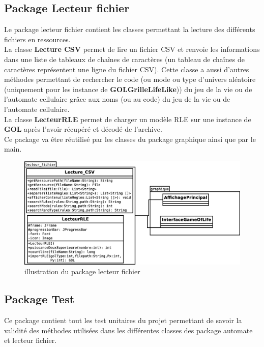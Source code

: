 \subsection{Package Lecteur fichier}
\par Le package lecteur fichier contient les classes permettant la lecture des différents fichiers en ressources.\\
La classe \textbf{Lecture CSV} permet de lire un fichier CSV et renvoie les informations dans une liste de tableaux de chaînes de caractères (un tableau de chaînes de caractères représentent une ligne du fichier CSV). Cette classe a aussi d'autres méthodes permettant de rechercher le code (ou mode ou type d'univers aléatoire (uniquement pour les instance de \textbf{GOLGrilleLifeLike}))  du jeu de la vie ou de l'automate cellulaire grâce aux noms (ou au code) du jeu de la vie ou de l'automate cellulaire.\\
La classe \textbf{LecteurRLE} permet de charger un modèle RLE sur une instance de \textbf{GOL} après l'avoir récupéré et décodé de l'archive.
\\
Ce package va être réutilisé par les classes du package graphique ainsi que par le main.
\begin{figure}[htp]
\centering
\includegraphics[scale=0.35]{images/Diagramme/package_lecteur_fichier.eps}
\caption{\label{fig:Lecteur_fichier}illustration du package lecteur fichier}
\end{figure}
\subsection{Package Test}
Ce package contient tout les test unitaires du projet permettant de savoir la validité des méthodes utilisées dans les différentes classes des package automate et lecteur fichier.